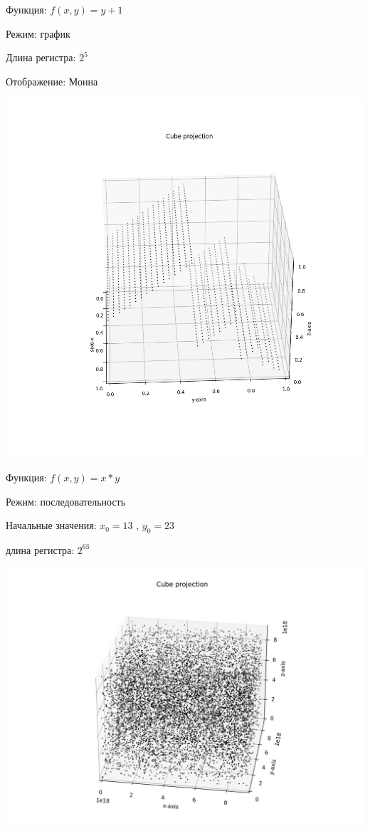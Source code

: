 Функция: $f(x, y) = y+1$

Режим: график

Длина регистра: $2^5$

Отображение: Монна

\includegraphics[scale=0.28]{gr_6.jpg}









\newpage

Функция: $f (x, y) = x*y$

Режим: последовательность

Начальные значения: $x_0 = 13$ , 
$y_0 = 23$

длина регистра: $2^{63}$

\includegraphics[scale=0.43]{gr3.jpg}

\fi 

\clearpage

